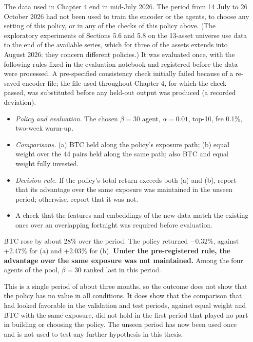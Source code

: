 \documentclass[12pt,a4paper]{report}
\providecommand{\tightlist}{\setlength{\itemsep}{0pt}\setlength{\parskip}{0pt}}
\begin{document}
The data used in Chapter 4 end in mid-July 2026. The period from 14 July
to 26 October 2026 had not been used to train the encoder or the agents,
to choose any setting of this policy, or in any of the checks of this
policy above. (The exploratory experiments of Sections 5.6 and 5.8 on
the 13-asset universe use data to the end of the available series, which
for three of the assets extends into August 2026; they concern different
policies.) It was evaluated once, with the following rules fixed in the
evaluation notebook and registered before the data were processed. A
pre-specified consistency check initially failed because of a re-saved
encoder file; the file used throughout Chapter 4, for which the check
passed, was substituted before any held-out output was produced (a
recorded deviation).

\begin{itemize}
\tightlist
\item
  \emph{Policy and evaluation.} The chosen \(\beta=30\) agent,
  \(\alpha=0.01\), top-10, fee 0.1\%, two-week warm-up.
\item
  \emph{Comparisons.} (a) BTC held along the policy's exposure path; (b)
  equal weight over the 44 pairs held along the same path; also BTC and
  equal weight fully invested.
\item
  \emph{Decision rule.} If the policy's total return exceeds both (a)
  and (b), report that its advantage over the same exposure was
  maintained in the unseen period; otherwise, report that it was not.
\item
  A check that the features and embeddings of the new data match the
  existing ones over an overlapping fortnight was required before
  evaluation.
\end{itemize}

BTC rose by about 28\% over the period. The policy returned −0.32\%,
against +2.47\% for (a) and +2.03\% for (b). \textbf{Under the
pre-registered rule, the advantage over the same exposure was not
maintained.} Among the four agents of the pool, \(\beta=30\) ranked last
in this period.

This is a single period of about three months, so the outcome does not
show that the policy has no value in all conditions. It does show that
the comparison that had looked favorable in the validation and test
periods, against equal weight and BTC with the same exposure, did not
hold in the first period that played no part in building or choosing the
policy. The unseen period has now been used once and is not used to test
any further hypothesis in this thesis.
\end{document}
